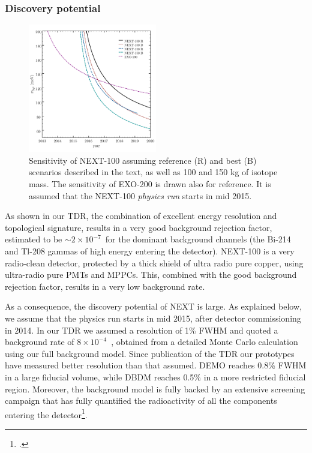 \subsubsection*{Discovery potential}

\begin{figure}
\centering
\includegraphics[width=0.5\textwidth]{img/EXOvsNEXT2.pdf}
\caption{Sensitivity of NEXT-100 assuming reference (R) and best (B) scenarios described in the text, as well as 100 and 150 kg of isotope mass.  The sensitivity of EXO-200 is drawn also for reference. It is assumed that the NEXT-100 \emph{physics run} starts in mid 2015.} \label{fig.exoNext}
\end{figure}

As shown in our TDR, the combination of excellent energy resolution and topological signature, results in a very good background rejection factor, estimated to be $\sim 2 \times 10^{-7}$~for the dominant background channels (the Bi-214 and Tl-208 
gammas of high energy entering the detector). NEXT-100 is a very radio-clean detector, protected by a thick shield of ultra radio pure copper, using ultra-radio pure PMTs and MPPCs. This, combined with the good background rejection factor, results in a very low background rate.

As a consequence, the discovery potential of NEXT is large. As explained below, we assume that the physics run starts in mid  2015, after detector commissioning in 2014. In our TDR we assumed a resolution of 1\% FWHM and quoted a background rate of $8 \times 10^{-4}$~\ckky, obtained from a detailed Monte Carlo calculation using our full background model. Since publication of the TDR our prototypes have measured better resolution than that assumed. DEMO reaches 0.8\% FWHM in a large fiducial volume, while DBDM reaches 0.5\% in a more restricted fiducial region. Moreover, the background model is fully backed by an extensive screening campaign that has fully quantified the radioactivity of all the components entering the detector\footcite{Alvarez:2012as}.

